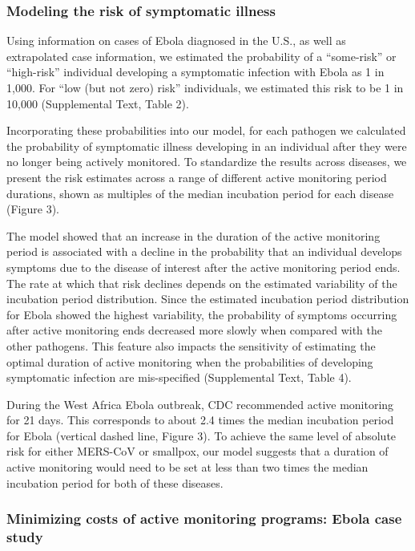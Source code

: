 \documentclass[]{article}
\begin{document}
\subsubsection{Modeling the risk of symptomatic
illness}\label{modeling-the-risk-of-symptomatic-illness}

Using information on cases of Ebola diagnosed in the U.S., as well as
extrapolated case information, we estimated the probability of a
``some-risk'' or ``high-risk'' individual developing a symptomatic
infection with Ebola as 1 in 1,000. For ``low (but not zero) risk''
individuals, we estimated this risk to be 1 in 10,000 (Supplemental
Text, Table 2).

Incorporating these probabilities into our model, for each pathogen we
calculated the probability of symptomatic illness developing in an
individual after they were no longer being actively monitored. To
standardize the results across diseases, we present the risk estimates
across a range of different active monitoring period durations, shown as
multiples of the median incubation period for each disease (Figure 3).

The model showed that an increase in the duration of the active
monitoring period is associated with a decline in the probability that
an individual develops symptoms due to the disease of interest after the
active monitoring period ends. The rate at which that risk declines
depends on the estimated variability of the incubation period
distribution. Since the estimated incubation period distribution for
Ebola showed the highest variability, the probability of symptoms
occurring after active monitoring ends decreased more slowly when
compared with the other pathogens. This feature also impacts the
sensitivity of estimating the optimal duration of active monitoring when
the probabilities of developing symptomatic infection are mis-specified
(Supplemental Text, Table 4).

During the West Africa Ebola outbreak, CDC recommended active monitoring
for 21 days. This corresponds to about 2.4 times the median incubation
period for Ebola (vertical dashed line, Figure 3). To achieve the same
level of absolute risk for either MERS-CoV or smallpox, our model
suggests that a duration of active monitoring would need to be set at
less than two times the median incubation period for both of these
diseases.

\subsubsection{Minimizing costs of active monitoring programs: Ebola
case
study}\label{minimizing-costs-of-active-monitoring-programs-ebola-case-study}
\end{document}

